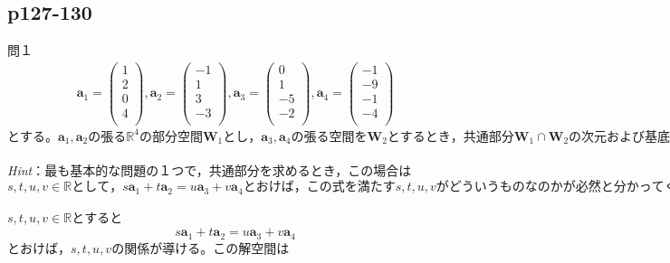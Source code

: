 \documentclass[dvipdfmx,uplatex,11pt]{jsarticle}
\begin{document}
\subsection{p127-130}
\noindent
問１
\noindent
\begin{eqnarray*}
\bm{a}_1=
\begin{pmatrix}
1 \\
2 \\
0 \\
4 \\
\end{pmatrix}
,
\bm{a}_2=
\begin{pmatrix}
-1 \\
1 \\
3 \\
-3 \\
\end{pmatrix}
,
\bm{a}_3=
\begin{pmatrix}
0 \\
1 \\
-5 \\
-2\\
\end{pmatrix}
,
\bm{a}_4=
\begin{pmatrix}
-1 \\
-9 \\
-1 \\
-4 \\
\end{pmatrix}
\end{eqnarray*}
$とする。\bm{a}_1, \bm{a}_2 の張る\mathbb{R}^4の部分空間\bm{W}_1 とし，\bm{a}_3, \bm{a}_4 の張る空間を\bm{W}_2 とするとき，共通部分\bm{W}_1 \cap \bm{W}_2 の次元および基底を求めよ。$\\ \\
\textsl{Hint}：最も基本的な問題の１つで，共通部分を求めるとき，この場合は$s,t,u,v \in \mathbb{R}として，s\bm{a}_1+t\bm{a}_2=u\bm{a}_3+v\bm{a}_4 とおけば，この式を満たすs,t,u,vがどういうものなのかが必然と分かってくる。なお，問題にされていないが和空間の基底を求める場合は，\bm{a}_1,\bm{a}_2,\bm{a}_3,\bm{a}_4から線型独立になるようなベクトルの組を求めればいい。$\\
\dotfill \\
$s,t,u,v \in \mathbb{R}とすると$
\begin{eqnarray*}
s\bm{a}_1+t\bm{a}_2=u\bm{a}_3+v\bm{a}_4
\end{eqnarray*}
$とおけば，s,t,u,vの関係が導ける。この解空間は$
\end{document}
